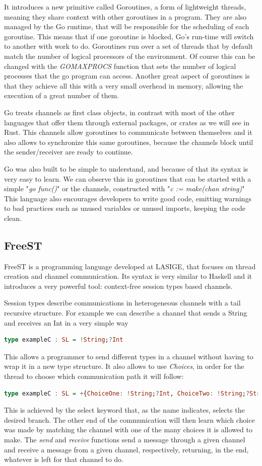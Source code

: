 \documentclass[runningheads]{llncs}
\begin{document}
It introduces a new primitive called Goroutines, a form of lightweight threads, meaning they share context with other goroutines in a program. They are also managed by the Go runtime, that will be responsible for the scheduling of each goroutine. This means that if one goroutine is blocked, Go's run-time will switch to another with work to do.
Goroutines run over a set of threads that by default match the number of logical processors of the environment. Of course this can be changed with the {\it GOMAXPROCS} function that sets the number of logical processes that the go program can access. Another great aspect of goroutines is that they achieve all this with a very small overhead in memory, allowing the execution of a great number of them.

Go treats channels as first class objects, in contrast with most of the other languages that offer them through external packages, or crates as we will see in Rust. This channels allow goroutines to communicate between themselves and it also allows to synchronize this same goroutines, because the channels block until the sender/receiver are ready to continue.

Go was also built to be simple to understand, and because of that its syntax is very easy to learn. We can observe this in goroutines that can be started with a simple "{\it go func()}" or the channels, constructed with "{\it c := make(chan string)}"
This language also encourages developers to write good code, emitting warnings to bad practices such as unused variables or unused imports, keeping the code clean.
\subsection{FreeST}
FreeST is a programming language developed at LASIGE, that focuses on thread creation and channel communication. Its syntax is very similar to Haskell and it introduces a very powerful tool: context-free session types based channels.

Session types describe communications in heterogeneous channels with a tail recursive structure\cite{session}.
For example we can describe a channel that sends a String and receives an Int in a very simple way
\begin{lstlisting}[language=haskell]
type exampleC : SL = !String;?Int
\end{lstlisting}
This allows a programmer to send different types in a channel without having to wrap it in a new type structure.
It also allows to use {\it Choices}, in order for the thread to choose which communication path it will follow:
\begin{lstlisting}[language=haskell]
type exampleC : SL = +{ChoiceOne: !String;?Int, ChoiceTwo: !String;?String}
\end{lstlisting}
This is achieved by the select keyword that, as the name indicates, selects the desired branch. The other end of the communication will then learn which choice was made by matching the channel with one of the many choices it is allowed to make.
The {\it send} and {\it receive} functions send a message through a given channel and receive a message from a given channel, respectively, returning, in the end, whatever is left for that channel to do.
\end{document}
